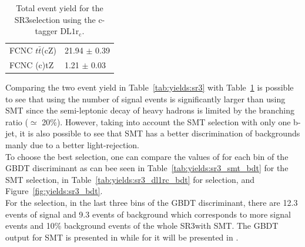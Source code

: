 \begin{table}[!h]
\begin{tabular}{|l|l|}
		\hline                                                                     
		FCNC $t\bar{t}$(cZ)   					      &  21.94 $\pm$ 0.39                \\
		FCNC (c)tZ              				      &  1.21 $\pm$ 0.03                          \\
		\hline
	\end{tabular}
	\caption{Total event yield for the SR3\tZc selection using the c-tagger $\mathrm{DL1r_{c}}$.}
\label{tab:yields:sr3_dl1rc}
\end{table}  
\newline \noindent Comparing the two event yield in Table~\ref{tab:yields:sr3} with Table~\ref{tab:yields:sr3_dl1rc} is possible to see that using \DLrc the number of signal events is significantly larger than using SMT since the semi-leptonic decay of heavy hadrons is limited by the branching ratio ($\simeq$ 20\%).
However, taking into account the SMT selection with only one b-jet, it is also possible to see that SMT has a better discrimination of backgrounds manly due to a better light-rejection.\\
To choose the best selection, one can compare the values of \ssplusb for each bin of the GBDT discriminant as can bee seen in Table~\ref{tab:yields:sr3_smt_bdt} for the SMT selection, in Table~\ref{tab:yields:sr3_dl1rc_bdt} for \DLrc selection, and Figure~\ref{fig:yields:sr3_bdt}.\\
For the \DLrc selection, in the last three bins of the GBDT discriminant, there are
12.3 events of signal and 9.3 events of background 
which corresponds to more signal events and 10\% background events of the whole SR3\tZc with SMT. The GBDT output for SMT is presented in  while for \DLrc it will be presented in .
